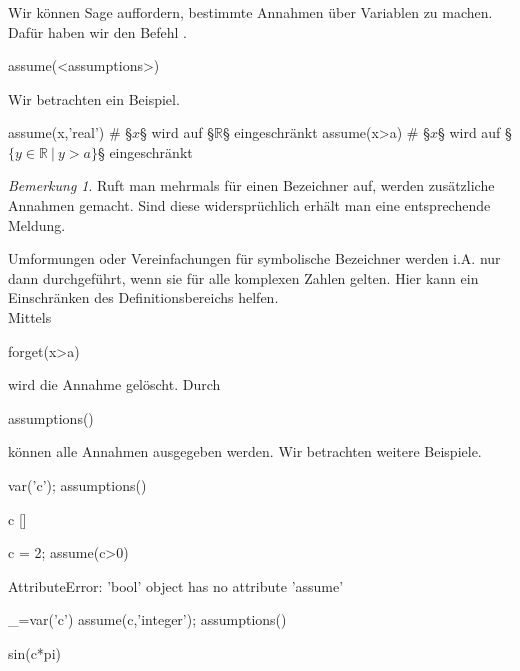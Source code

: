 \documentclass[fontsize=12pt,paper=a4,twoside,bibtotoc,idxtotoc,
liststotoc,pagesize,BCOR1.2cm,DIV15,chapterprefix,pagesize=pdftex]{scrbook}
\theoremstyle{plain}
\theoremstyle{definition}
\theoremstyle{remark}
\newtheorem{bem}[equation]{Bemerkung}
\begin{document}
\subsubsection{}
Wir können Sage auffordern, bestimmte Annahmen über Variablen zu machen. Dafür haben wir den Befehl .
\begin{sagein}
assume(<assumptions>)
\end{sagein}
Wir betrachten ein Beispiel.
\begin{sagein}
assume(x,'real') # §$x$§ wird auf §$\mathbb{R}$§ eingeschränkt
assume(x>a) # §$x$§ wird auf  §$\{y \in \mathbb{R}\ |\ y>a\}$§ eingeschränkt
\end{sagein}
\begin{bem}
Ruft man  mehrmals für einen Bezeichner auf, werden zusätzliche Annahmen gemacht. Sind diese
widersprüchlich erhält man eine entsprechende Meldung.
\end{bem}
Umformungen oder Vereinfachungen für symbolische Bezeichner
werden i.A. nur dann durchgeführt,
wenn sie für alle komplexen Zahlen gelten. Hier kann ein Einschränken
des Definitionsbereichs helfen.\\
 Mittels 
\begin{sagein}
forget(x>a)
\end{sagein}
wird die Annahme  gelöscht.
 Durch 
\begin{sagein}
assumptions() 
\end{sagein}
können alle Annahmen ausgegeben werden.
Wir betrachten weitere Beispiele.
\begin{sagein}
var('c'); assumptions()
\end{sagein}
\begin{sageout}
c
[]
\end{sageout}
\begin{sagein}
c = 2; assume(c>0)
\end{sagein}
\begin{sageout}
 AttributeError: 'bool' object has no attribute 'assume'
\end{sageout}
\begin{sagein}
_=var('c')
assume(c,'integer'); assumptions()
\end{sagein}
\begin{sageout}
[c is integer]
\end{sageout}
\begin{sagein}
sin(c*pi)
\end{sagein}
\end{document}
